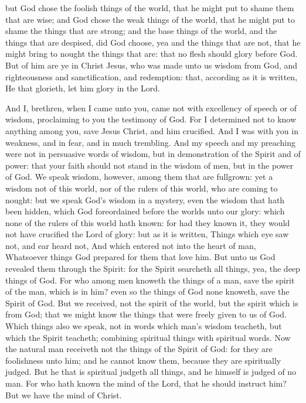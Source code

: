 but God chose the foolish things of the world, that he might put to shame them that are wise; and God chose the weak things of the world, that he might put to shame the things that are strong; and the base things of the world, and the things that are despised, did God choose, yea and the things that are not, that he might bring to nought the things that are: that no flesh should glory before God. But of him are ye in Christ Jesus, who was made unto us wisdom from God, and righteousness and sanctification, and redemption: that, according as it is written, He that glorieth, let him glory in the Lord. 

And I, brethren, when I came unto you, came not with excellency of speech or of wisdom, proclaiming to you the testimony of God. For I determined not to know anything among you, save Jesus Christ, and him crucified. And I was with you in weakness, and in fear, and in much trembling. And my speech and my preaching were not in persuasive words of wisdom, but in demonstration of the Spirit and of power: that your faith should not stand in the wisdom of men, but in the power of God.  We speak wisdom, however, among them that are fullgrown: yet a wisdom not of this world, nor of the rulers of this world, who are coming to nought: but we speak God’s wisdom in a mystery, even the wisdom that hath been hidden, which God foreordained before the worlds unto our glory: which none of the rulers of this world hath known: for had they known it, they would not have crucified the Lord of glory: but as it is written, Things which eye saw not, and ear heard not, And which entered not into the heart of man, Whatsoever things God prepared for them that love him.  But unto us God revealed them through the Spirit: for the Spirit searcheth all things, yea, the deep things of God. For who among men knoweth the things of a man, save the spirit of the man, which is in him? even so the things of God none knoweth, save the Spirit of God. But we received, not the spirit of the world, but the spirit which is from God; that we might know the things that were freely given to us of God. Which things also we speak, not in words which man’s wisdom teacheth, but which the Spirit teacheth; combining spiritual things with spiritual words. Now the natural man receiveth not the things of the Spirit of God: for they are foolishness unto him; and he cannot know them, because they are spiritually judged. But he that is spiritual judgeth all things, and he himself is judged of no man. For who hath known the mind of the Lord, that he should instruct him? But we have the mind of Christ. 

